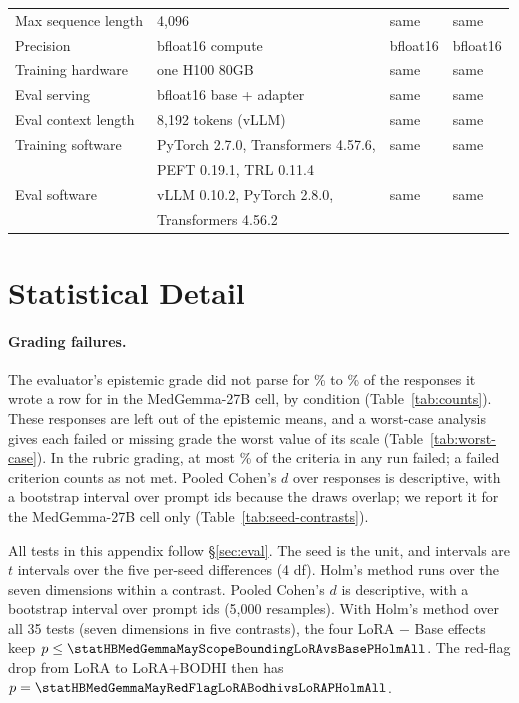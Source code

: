 \documentclass{article}
\newcommand{\bodhi}{BODHI}
\begin{document}
\begin{table}[t]
\begin{tabular}{llll}
Max sequence length & 4,096 & same & same \\
Precision & bfloat16 compute & bfloat16 & bfloat16 \\
Training hardware & one H100 80GB & same & same \\
Eval serving & bfloat16 base + adapter & same & same \\
Eval context length & 8,192 tokens (vLLM) & same & same \\
Training software & PyTorch 2.7.0, Transformers 4.57.6, & same & same \\
 & PEFT 0.19.1, TRL 0.11.4 & & \\
Eval software & vLLM 0.10.2, PyTorch 2.8.0, & same & same \\
 & Transformers 4.56.2 & & \\
\bottomrule
\end{tabular}
\end{table}

\section{Statistical Detail}
\label{app:stats}

\paragraph{Grading failures.} The evaluator's epistemic grade did not parse for
\statHBMedGemmaMayEpistemicParseFailPctBase\% to \statHBMedGemmaMayEpistemicParseFailPctMax\% of
the responses it wrote a row for in the MedGemma-27B cell, by condition (Table~\ref{tab:counts}).
These responses are left out of the epistemic means, and a worst-case analysis gives each failed or
missing grade the worst value of its scale (Table~\ref{tab:worst-case}). In the rubric grading, at
most \statHBMedGemmaMayRubricParseFailPctMaxRun\% of the criteria in any run failed; a failed
criterion counts as not met. Pooled Cohen's $d$ over responses is descriptive, with a bootstrap
interval over prompt ids because the draws overlap; we report it for the MedGemma-27B cell only
(Table~\ref{tab:seed-contrasts}).

All tests in this appendix follow \S\ref{sec:eval}. The seed is the unit, and intervals are $t$
intervals over the five per-seed differences (4 df). Holm's method runs over the seven dimensions
within a contrast. Pooled Cohen's $d$ is descriptive, with a bootstrap interval over prompt ids
(5,000 resamples). With Holm's method over all 35 tests (seven dimensions in five contrasts), the
four LoRA $-$ Base effects keep $p \leq \statHBMedGemmaMayScopeBoundingLoRAvsBasePHolmAll$. The red-flag drop
from LoRA to LoRA+\bodhi{} then has $p = \statHBMedGemmaMayRedFlagLoRABodhivsLoRAPHolmAll$.
\end{document}
